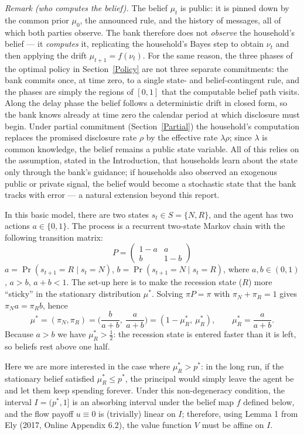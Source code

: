 \documentclass[12pt]{article}
\begin{document}
\noindent\emph{Remark (who computes the belief).} The belief $\mu_t$ is public: it is pinned down by the common prior $\mu_0$, the announced rule, and the history of messages, all of which both parties observe. The bank therefore does not \emph{observe} the household's belief --- it \emph{computes} it, replicating the household's Bayes step to obtain $\nu_t$ and then applying the drift $\mu_{t+1}=f(\nu_t)$. For the same reason, the three phases of the optimal policy in Section~\ref{Policy} are not three separate commitments: the bank commits once, at time zero, to a single state- and belief-contingent rule, and the phases are simply the regions of $[0,1]$ that the computable belief path visits. Along the delay phase the belief follows a deterministic drift in closed form, so the bank knows already at time zero the calendar period at which disclosure must begin. Under partial commitment (Section~\ref{Partial}) the household's computation replaces the promised disclosure rate $\rho$ by the effective rate $\lambda\rho$; since $\lambda$ is common knowledge, the belief remains a public state variable. All of this relies on the assumption, stated in the Introduction, that households learn about the state only through the bank's guidance; if households also observed an exogenous public or private signal, the belief would become a stochastic state that the bank tracks with error --- a natural extension beyond this report.

In this basic model, there are two states $s_t \in S = \{N,R\}$, and the agent has two actions $a \in \{0,1\}$. The process is a recurrent two-state Markov chain with the following transition matrix:
\[
P=\begin{pmatrix}1-a & a\\[2pt] b & 1-b\end{pmatrix}
\]
$a=\Pr(s_{t+1}=R \mid s_t = N)$, $b=\Pr(s_{t+1}=N \mid s_t = R)$, where $a,b\in(0,1)$, $a>b$, $a+b<1$. The set-up here is to make the recession state ($R$) more ``sticky'' in the stationary distribution $\mu^*$. Solving $\pi P = \pi$ with $\pi_N + \pi_R = 1$ gives $\pi_N a = \pi_R b$, hence
\[
\mu^* = (\pi_N, \pi_R) = \Big(\frac{b}{a+b},\ \frac{a}{a+b}\Big) = (1-\mu_R^*,\ \mu_R^*),
\qquad \mu_R^* = \frac{a}{a+b} .
\]
Because $a>b$ we have $\mu_R^* > \tfrac12$: the recession state is entered faster than it is left, so beliefs rest above one half.

Here we are more interested in the case where $\mu_R^* > p^*$: in the long run, if the stationary belief satisfied $\mu_R^* \le p^*$, the principal would simply leave the agent be and let them keep spending forever. Under this non-degeneracy condition, the interval $I=(p^*,1]$ is an absorbing interval under the belief map $f$ defined below, and the flow payoff $u \equiv 0$ is (trivially) linear on $I$; therefore, using Lemma 1 from Ely (2017, Online Appendix 6.2), the value function $V$ must be affine on $I$.
\end{document}

